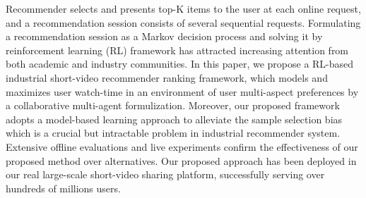 Recommender selects and presents top-K items to the user at each online request, and a recommendation session consists of several sequential requests. 
Formulating a recommendation session as a Markov decision process and solving it by reinforcement learning (RL) framework has attracted increasing attention from both academic and industry communities. 
In this paper, we propose a RL-based industrial short-video recommender ranking framework, which models and maximizes user watch-time in an environment of user multi-aspect preferences by a collaborative multi-agent formulization. Moreover, our proposed framework adopts a model-based learning approach to alleviate the sample selection bias which is a crucial but intractable problem in industrial recommender system.
Extensive offline evaluations and live experiments confirm the effectiveness of our proposed method over alternatives. 
Our proposed approach has been deployed in our real large-scale short-video sharing platform, successfully serving over hundreds of millions users.